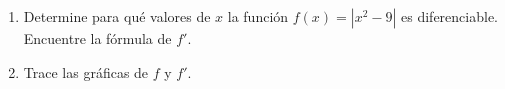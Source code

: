 \item 
\begin{enumerate}
    \item Determine para qué valores de $x$ la función $f(x) = |x^2 - 9|$ es diferenciable. Encuentre la fórmula de $f'$.
    \item Trace las gráficas de $f$ y $f'$.
\end{enumerate}
